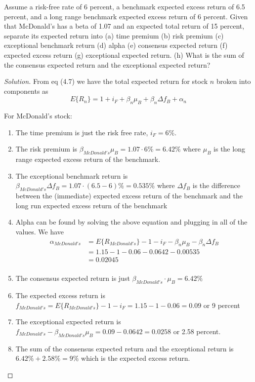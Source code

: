 \begin{problem}{4.1}
 Assume a risk-free rate of 6 percent, a benchmark expected excess return of 6.5 percent, and a long range benchmark expected excess return of 6 percent. Given that McDonald's has a beta of 1.07 and an expected total return of 15 percent, separate its expected return into (a) time premium (b) risk premium (c) exceptional benchmark return (d) alpha (e) consensus expected return (f) expected excess return (g) exceptional expected return. (h) What is the sum of the consensus expected return and the exceptional expected return?
\end{problem}

\begin{proof}[Solution]
 From eq (4.7) we have the total expected return for stock $n$ broken into components as
 \begin{equation*}
  E\{R_{n}\}=1+i_{F}+\beta_{n}\mu_{B}+\beta_{n}\Delta f_{B}+\alpha_{n}
 \end{equation*}
 
 For McDonald's stock:
 \begin{enumerate}[label=(\alph*)]
  \item{The time premium is just the risk free rate, $i_{F}=6\%$.}
  \item{The risk premium is $\beta_{McDonald's}\mu_{B}=1.07\cdot 6\%=6.42\%$ where $\mu_{B}$ is the long range expected excess return of the benchmark.}
  \item{The exceptional benchmark return is $\beta_{McDonald's}\Delta f_{B}=1.07\cdot(6.5-6)\%=0.535\%$ where $\Delta f_{B}$ is the difference between the (immediate) expected excess return of the benchmark and the long run expected excess return of the benchmark}
  \item{Alpha can be found by solving the above equation and plugging in all of the values. We have
	\begin{align*}
	 \alpha_{McDonald's}&=E\{R_{McDonald's}\}-1-i_{F}-\beta_{n}\mu_{B}-\beta_{n}\Delta f_{B} \\
			    &=1.15-1-0.06-0.0642-0.00535\\
			    &=0.02045\\
	\end{align*}
	}
  \item{The consensus expected return is just $\beta_{McDonald's}\cdot\mu_{B}=6.42\%$}
  \item{The expected excess return is $f_{McDonald's}=E\{R_{McDonald's}\}-1-i_{F}=1.15-1-0.06=0.09$ or 9 percent}
  \item{The exceptional expected return is $f_{McDonald's}-\beta_{McDonald's}\mu_{B}=0.09-0.0642=0.0258$ or 2.58 percent.}
  \item{The sum of the consensus expected return and the exceptional return is $6.42\% + 2.58\%=9\%$ which is the expected excess return.}
 \end{enumerate}
\end{proof}

